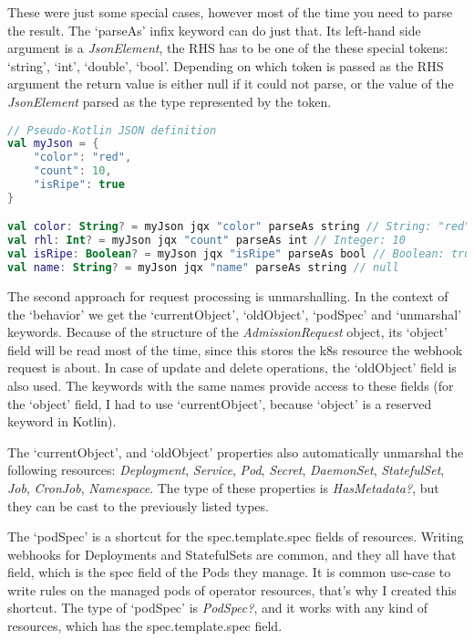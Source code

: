 These were just some special cases, however most of the time you need to parse the result. The `parseAs' infix keyword can do just that. Its left-hand side argument is a \emph{JsonElement}, the RHS has to be one of the these special tokens: `string', `int', `double', `bool'. Depending on which token is passed as the RHS argument the return value is either null if it could not parse, or the value of the \emph{JsonElement} parsed as the type represented by the token.

\begin{lstlisting}[caption={Usage of `parseAs'},language=Kotlin,label=code:jqx2]
// Pseudo-Kotlin JSON definition
val myJson = {
    "color": "red",
    "count": 10,
    "isRipe": true
}

val color: String? = myJson jqx "color" parseAs string // String: "red"
val rhl: Int? = myJson jqx "count" parseAs int // Integer: 10
val isRipe: Boolean? = myJson jqx "isRipe" parseAs bool // Boolean: true
val name: String? = myJson jqx "name" parseAs string // null
\end{lstlisting}

The second approach for request processing is unmarshalling. In the context of the `behavior' we get the `currentObject', `oldObject', `podSpec' and `unmarshal' keywords. Because of the structure of the \emph{AdmissionRequest} object, its `object' field will be read most of the time, since this stores the k8s resource the webhook request is about. In case of update and delete operations, the `oldObject' field is also used. The keywords with the same names provide access to these fields (for the `object' field, I had to use `currentObject', because `object' is a reserved keyword in Kotlin). 

The `currentObject', and `oldObject' properties also automatically unmarshal the following resources: \emph{Deployment}, \emph{Service}, \emph{Pod}, \emph{Secret}, \emph{DaemonSet}, \emph{StatefulSet}, \emph{Job}, \emph{CronJob}, \emph{Namespace}. The type of these properties is \emph{HasMetadata?}, but they can be cast to the previously listed types.

The `podSpec' is a shortcut for the spec.template.spec fields of resources. Writing webhooks for Deployments and StatefulSets are common, and they all have that field, which is the spec field of the Pods they manage. It is common use-case to write rules on the managed pods of operator resources, that's why I created this shortcut. The type of `podSpec' is \emph{PodSpec?}, and it works with any kind of resources, which has the spec.template.spec field.

